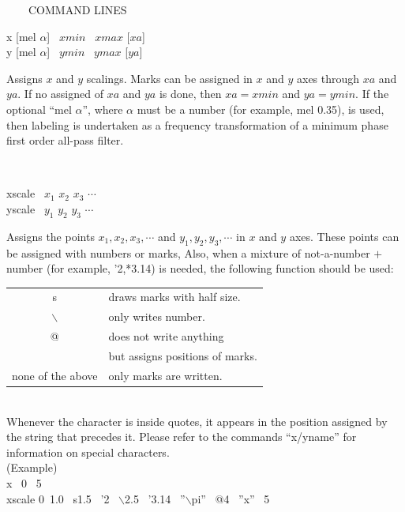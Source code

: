 \vspace{-1cm}
\begin{qsection}{\ ~~~COMMAND LINES}
\begin{minipage}[t]{5.5cm}
x [mel $\alpha$]~ $xmin$ ~$xmax$ [$xa$]\\
y [mel $\alpha$]~ $ymin$ ~$ymax$ [$ya$]\\
\end{minipage}
\begin{minipage}[t]{9cm}
Assigns $x$ and $y$ scalings.
Marks can be assigned in $x$ and $y$ axes through $xa$ and $ya$.
If no assigned of $xa$ and $ya$ is done,
then $xa = xmin$ and $ya = ymin$.
If the optional ``mel $\alpha$'', where $\alpha$ must be
a number (for example, mel 0.35), is used,
then labeling is undertaken as a frequency transformation of
a minimum phase first order all-pass filter.
\end{minipage} \\

\begin{minipage}[t]{5.5cm}
xscale ~$x_1$ $x_2$ $x_3$ $\cdots$\\
yscale ~$y_1$ $y_2$ $y_3$ $\cdots$
\end{minipage}
\begin{minipage}[t]{9cm}
Assigns the points $x_1, x_2,x_3,\cdots$
and $y_1,y_2,y_3,\cdots$ in $x$ and $y$ axes.
These points can be assigned with numbers or marks,
Also, when a mixture of not-a-number $+$ number (for example, '2,*3.14)
is needed, the following function should be used:

\begin{tabular}{cl}
s & draws marks with half size.\\
$\backslash$& only writes number.\\
@ & does not write anything \\
  & but assigns positions of marks.\\
none of the above & only marks are written.
\end{tabular}\\

Whenever the character is inside quotes,
it appears in the position assigned
by the string that precedes it.
Please refer to the commands ``x/yname'' for information on
special characters.\\
(Example)\\
x ~0 ~5\\
xscale 0~1.0 ~s1.5 ~'2 ~$\backslash$2.5 ~'3.14 ~''$\backslash$pi'' ~@4 ~''x'' ~5\\


\end{minipage}
\end{qsection}
